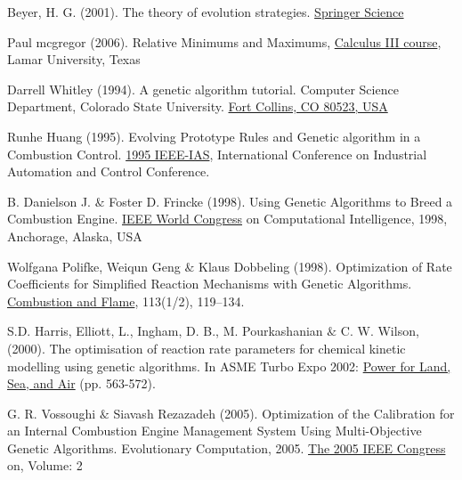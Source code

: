 \documentclass[12pt]{article}
\numberwithin{equation}{section}
\begin{document}
\begin{flushleft}
\newpage

\begin{thebibliography}{9} 

 \label{c6}
Beyer, H. G. (2001). The theory of evolution strategies. \href{https://www.springer.com/gp/book/9783540672975}{Springer Science}


 \label{c_optima}
Paul mcgregor (2006). Relative Minimums and Maximums, \href{https://tutorial.math.lamar.edu/Classes/CalcIII/RelativeExtrema.aspx}{Calculus III course}, Lamar University, Texas


 \label{c7}
Darrell Whitley (1994). A genetic algorithm tutorial. Computer Science Department, Colorado State University. \href{https://www.cs.colostate.edu/~genitor/MiscPubs/tutorial.pdf}{Fort Collins, CO 80523, USA}


 \label{ga0}
Runhe Huang (1995). Evolving Prototype Rules and Genetic algorithm
in a Combustion Control. \href{https://ieeexplore.ieee.org/document/465834?section=abstract}{1995 IEEE-IAS}, International Conference on Industrial Automation and Control Conference.


 \label{ga1}
B. Danielson J. $\&$ Foster D. Frincke (1998). Using Genetic Algorithms to Breed a Combustion Engine. \href{https://ieeexplore.ieee.org/document/699722}{IEEE World Congress} on Computational Intelligence, 1998, Anchorage, Alaska, USA


 \label{ga2}
Wolfgana Polifke, Weiqun Geng $\&$ Klaus Dobbeling (1998). Optimization of Rate Coefficients for Simplified Reaction
Mechanisms with Genetic Algorithms. \href{https://www.sciencedirect.com/science/article/abs/pii/S0010218097002125}{Combustion and Flame}, 113(1/2), 119–134.


 \label{f11} 
S.D. Harris, Elliott, L., Ingham, D. B., M. Pourkashanian $\&$ C. W. Wilson, (2000). The optimisation of reaction rate parameters for chemical kinetic modelling using genetic algorithms. In ASME Turbo Expo 2002: \href{https://asmedigitalcollection.asme.org/GT/proceedings-abstract/GT2002/36061/563/295726}{Power for Land, Sea, and Air} (pp. 563-572).


 \label{f12}
G. R. Vossoughi $\&$ Siavash Rezazadeh (2005). Optimization of the Calibration for an Internal Combustion Engine Management System Using Multi-Objective Genetic Algorithms. Evolutionary Computation, 2005. \href{https://www.researchgate.net/publication/4201526_Optimization_of_the_calibration_for_an_internal_combustion_engine_management_system_using_multi-objective_genetic_algorithms}{The 2005 IEEE Congress} on, Volume: 2



\end{thebibliography}
\end{flushleft}
\end{document}
